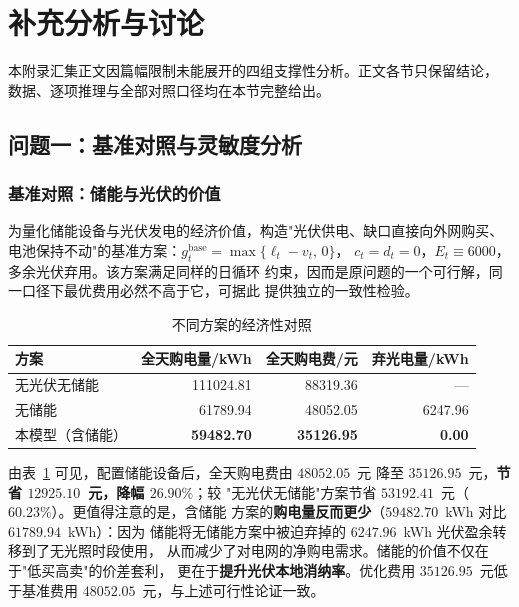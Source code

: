 \newpage
\section{补充分析与讨论}
\label{app:extra}

本附录汇集正文因篇幅限制未能展开的四组支撑性分析。正文各节只保留结论，
数据、逐项推理与全部对照口径均在本节完整给出。

\subsection{问题一：基准对照与灵敏度分析}

\subsubsection{基准对照：储能与光伏的价值}

为量化储能设备与光伏发电的经济价值，构造"光伏供电、缺口直接向外网购买、
电池保持不动"的基准方案：$g_t^{\mathrm{base}} = \max\{\ell_t - v_t,\,0\}$，
$c_t = d_t = 0$，$E_t \equiv 6000$，多余光伏弃用。该方案满足同样的日循环
约束，因而是原问题的一个可行解，同一口径下最优费用必然不高于它，可据此
提供独立的一致性检验。

\begin{table}[htbp]
  \centering
  \caption{不同方案的经济性对照}
  \label{tab:p1-benchmark}
  \begin{tabular}{lrrr}
    \toprule
    方案 & 全天购电量/kWh & 全天购电费/元 & 弃光电量/kWh \\
    \midrule
    无光伏无储能 & 111024.81 & 88319.36 & --- \\
    无储能       & 61789.94  & 48052.05 & 6247.96 \\
    本模型（含储能） & \textbf{59482.70} & \textbf{35126.95} & \textbf{0.00} \\
    \bottomrule
  \end{tabular}
\end{table}

由表~\ref{tab:p1-benchmark} 可见，配置储能设备后，全天购电费由 $48052.05$~元
降至 $35126.95$~元，\textbf{节省 $12925.10$~元，降幅 $26.90\%$}；较
"无光伏无储能"方案节省 $53192.41$~元（$60.23\%$）。更值得注意的是，含储能
方案的\textbf{购电量反而更少}（$59482.70$~kWh 对比 $61789.94$~kWh）：因为
储能将无储能方案中被迫弃掉的 $6247.96$~kWh 光伏盈余转移到了无光照时段使用，
从而减少了对电网的净购电需求。储能的价值不仅在于"低买高卖"的价差套利，
更在于\textbf{提升光伏本地消纳率}。优化费用 $35126.95$~元低于基准费用
$48052.05$~元，与上述可行性论证一致。

